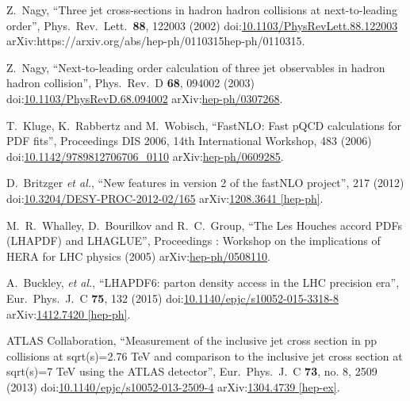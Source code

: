 \begin{thebibliography}{99}


Z.~Nagy, ``Three jet cross-sections in hadron hadron collisions at next-to-leading order'', Phys.\ Rev.\ Lett.\  {\bf 88}, 122003 (2002) doi:\href{http://dx.doi.org/10.1103/PhysRevLett.88.122003}{10.1103/PhysRevLett.88.122003} arXiv:{https://arxiv.org/abs/hep-ph/0110315}{hep-ph/0110315}.

Z.~Nagy, ``Next-to-leading order calculation of three jet observables in hadron hadron collision'', Phys.\ Rev.\ D {\bf 68}, 094002 (2003) doi:\href{http://dx.doi.org/10.1103/PhysRevD.68.094002}{10.1103/PhysRevD.68.094002} arXiv:\href{https://arxiv.org/abs/hep-ph/0307268}{hep-ph/0307268}.

T.~Kluge, K.~Rabbertz and M.~Wobisch, ``FastNLO: Fast pQCD calculations for PDF fits'', Proceedings DIS 2006, 14th International Workshop, 483 (2006) doi:\href{http://dx.doi.org/10.1142/9789812706706\_0110}{10.1142/9789812706706\_0110} arXiv:\href{https://arxiv.org/abs/hep-ph/0609285}{hep-ph/0609285}.

D.~Britzger {\it et al.}, ``New features in version 2 of the fastNLO project'', 217 (2012) doi:\href{http://dx.doi.org/10.3204/DESY-PROC-2012-02/165}{10.3204/DESY-PROC-2012-02/165} arXiv:\href{https://arxiv.org/abs/1208.3641}{1208.3641 [hep-ph]}.

M.~R.~Whalley, D.~Bourilkov and R.~C.~Group, ``The Les Houches accord PDFs (LHAPDF) and LHAGLUE'',  Proceedings : Workshop on the implications of HERA for LHC physics (2005) arXiv:\href{https://arxiv.org/abs/hep-ph/0508110}{hep-ph/0508110}.  
  
A.~Buckley, {\it et al.}, ``LHAPDF6: parton density access in the LHC precision era'', Eur.\ Phys.\ J.\ C {\bf 75}, 132 (2015) doi:\href{http://dx.doi.org/10.1140/epjc/s10052-015-3318-8}{10.1140/epjc/s10052-015-3318-8} arXiv:\href{https://arxiv.org/abs/1412.7420}{1412.7420 [hep-ph]}.

ATLAS Collaboration, ``Measurement of the inclusive jet cross section in pp collisions at sqrt(s)=2.76 TeV and comparison to the inclusive jet cross section at sqrt(s)=7 TeV using the ATLAS detector'', Eur.\ Phys.\ J.\ C {\bf 73}, no. 8, 2509 (2013) doi:\href{http://dx.doi.org/10.1140/epjc/s10052-013-2509-4}{10.1140/epjc/s10052-013-2509-4} arXiv:\href{https://arxiv.org/abs/1304.4739}{1304.4739 [hep-ex]}.
 

\end{thebibliography}
